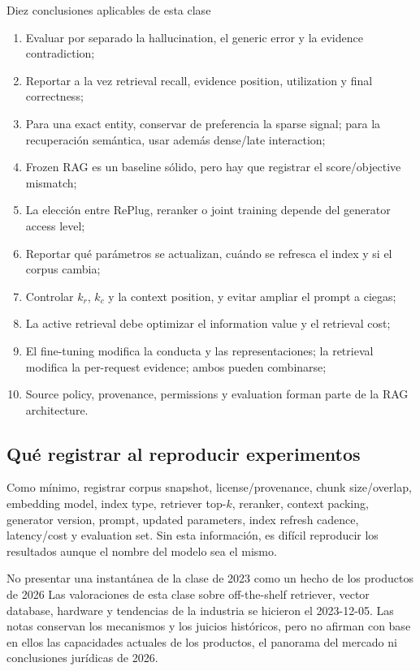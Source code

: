 \documentclass[a4paper]{article}
\begin{document}
\begin{importantbox}{Diez conclusiones aplicables de esta clase}
\begin{enumerate}
  \item Evaluar por separado la hallucination, el generic error y la evidence contradiction;
  \item Reportar a la vez retrieval recall, evidence position, utilization y final correctness;
  \item Para una exact entity, conservar de preferencia la sparse signal; para la recuperación semántica, usar además dense/late interaction;
  \item Frozen RAG es un baseline sólido, pero hay que registrar el score/objective mismatch;
  \item La elección entre RePlug, reranker o joint training depende del generator access level;
  \item Reportar qué parámetros se actualizan, cuándo se refresca el index y si el corpus cambia;
  \item Controlar $k_r$, $k_c$ y la context position, y evitar ampliar el prompt a ciegas;
  \item La active retrieval debe optimizar el information value y el retrieval cost;
  \item El fine-tuning modifica la conducta y las representaciones; la retrieval modifica la per-request evidence; ambos pueden combinarse;
  \item Source policy, provenance, permissions y evaluation forman parte de la RAG architecture.
\end{enumerate}
\end{importantbox}

\subsection{Qué registrar al reproducir experimentos}

Como mínimo, registrar corpus snapshot, license/provenance, chunk size/overlap, embedding model, index type, retriever top-$k$, reranker, context packing, generator version, prompt, updated parameters, index refresh cadence, latency/cost y evaluation set. Sin esta información, es difícil reproducir los resultados aunque el nombre del modelo sea el mismo.

\begin{warningbox}{No presentar una instantánea de la clase de 2023 como un hecho de los productos de 2026}
Las valoraciones de esta clase sobre off-the-shelf retriever, vector database, hardware y tendencias de la industria se hicieron el 2023-12-05. Las notas conservan los mecanismos y los juicios históricos, pero no afirman con base en ellos las capacidades actuales de los productos, el panorama del mercado ni conclusiones jurídicas de 2026.
\end{warningbox}
\end{document}
